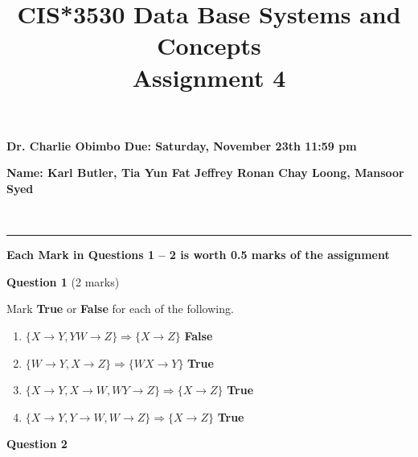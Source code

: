 \documentclass[12pt]{article} \pagestyle{plain}
\title{\vspace{-25mm}CIS*3530 Data Base Systems and Concepts  \\ Assignment 4 }
\date{}
\begin{document}
\maketitle

\vspace{-20mm}
\begin{center}
{\bf Dr. Charlie Obimbo \hfill Due: Saturday, November 23th 11:59 pm}
\end{center}

\noindent
{\bf Name: Karl Butler, Tia Yun Fat Jeffrey Ronan Chay Loong, Mansoor Syed } 

\

\hrule

\bigskip
\noindent
{\bf Each Mark in Questions 1 -- 2 is worth 0.5 marks of the assignment}

\medskip

 \noindent
  {\bf Question 1} \hfill (2 marks)

\vspace{4mm}

  Mark {\bf True} or {\bf False} for each of the following.

  \begin{enumerate}
    \item $\{ X \rightarrow  Y, YW \rightarrow  Z \} \Rightarrow \{ X \rightarrow Z \}$ \hspace{50mm}  {\bf False}

    \item $\{W \rightarrow Y, X \rightarrow  Z \} \Rightarrow \{ WX \rightarrow Y \}$ \hspace{49mm}  {\bf True}

    \item $\{X \rightarrow  Y, X \rightarrow   W, WY \rightarrow  Z \} \Rightarrow \{ X \rightarrow  Z \}$ \hspace{35mm}  {\bf True}

    \item $\{X \rightarrow  Y, Y \rightarrow   W, W \rightarrow  Z \} \Rightarrow \{ X \rightarrow  Z \}$ \hspace{39mm}  {\bf True}

  \end{enumerate}
\medskip

 \noindent
  {\bf Question 2}
\end{document}
